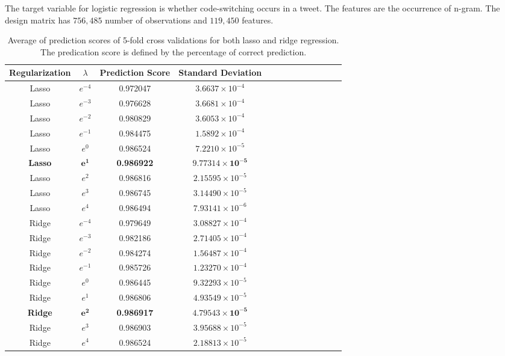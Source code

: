 \documentclass[conference]{IEEEtran}
\begin{document}
The target variable for logistic regression is whether code-switching occurs in a tweet. The features are the occurrence of n-gram. The design matrix has $756,485$ number of observations and $119,450$ features. 



\begin{table}[h!] 
 \caption{Average of prediction scores of 5-fold cross validations for both lasso and ridge regression. The predication score is defined by the percentage of correct prediction.}
\centering %
\begin{tabular}{c c c c c c rrrrrrr} %
\hline\hline %
	Regularization & 	$\lambda$		&	Prediction Score	&	Standard Deviation		%
\\ [0.5ex] 
\hline 
	Lasso 	& 	$e^{-4}$		&	0.972047 	&	$3.6637 \times 10^{-4}$	\\
	Lasso 	& 	$e^{-3}$		&	0.976628	&
$3.6681 \times 10^{-4}$		\\	
	Lasso 	& 	$e^{-2}$		&	0.980829	&
$3.6053 \times 10^{-4}$           \\	
	Lasso 	& 	$e^{-1}$		&	0.984475	&
$1.5892 \times 10^{-4}$           \\	
	Lasso 	& 	$e^{0}$		&	0.986524	&
$7.2210 \times 10^{-5}$          \\	
	\textbf{Lasso} 	& 	$\mathbf{e^{1}}$		&	\textbf{0.986922}	&
$\mathbf{9.77314 \times 10^{-5}}$          \\	
	Lasso 	& 	$e^{2}$		&	0.986816	&
$2.15595 \times 10^{-5}$           \\	
	Lasso 	& 	$e^{3}$		&	0.986745	&
$3.14490 \times 10^{-5}$           \\	
	Lasso 	& 	$e^{4}$		&	0.986494	&
$7.93141 \times 10^{-6}$           \\	\hline
	Ridge 	& 	$e^{-4}$		&	0.979649	&
$3.08827 \times 10^{-4}$           \\	
	Ridge 	& 	$e^{-3}$		&	0.982186	&
$2.71405 \times 10^{-4}$         \\	
	Ridge 	& 	$e^{-2}$		&	0.984274	&
$1.56487 \times 10^{-4}$           \\	
	Ridge 	& 	$e^{-1}$		&	0.985726	&
$1.23270 \times 10^{-4}$           \\	
	Ridge 	& 	$e^{0}$		&	0.986445	&
$9.32293 \times 10^{-5}$           \\	
	Ridge 	& 	$e^{1}$		&	0.986806	&
$4.93549 \times 10^{-5}$           \\	
	\textbf{Ridge} 	& 	$\mathbf{e^{2}}$		&	\textbf{0.986917}	& 
$\mathbf{4.79543 \times 10^{-5}}$           \\	
	Ridge 	& 	$e^{3}$		&	0.986903	&
$3.95688 \times 10^{-5}$           \\	
	Ridge 	& 	$e^{4}$		&	0.986524	&
$2.18813 \times 10^{-5}$           \\	
\hline \hline %
\end{tabular} 
\label{tab:predictionScores} 
\end{table} 
\end{document}
